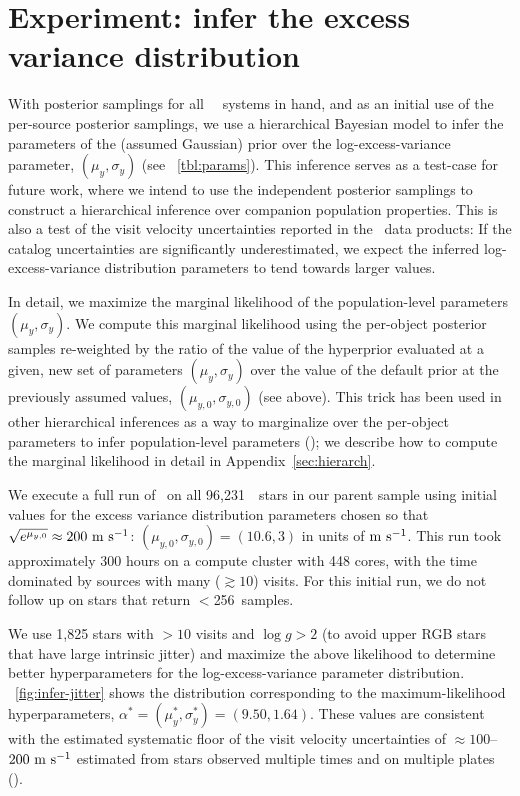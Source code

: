 \documentclass[modern, letterpaper]{aastex62}
\newcommand{\apogee}{\project{\acronym{APOGEE}}}
\newcommand{\thejoker}{\project{The~Joker}}
\newcommand{\DR}{\acronym{DR14}}
\newcommand{\logg}{\ensuremath{\log g}}
\newcommand{\nposterior}{256}
\newcommand{\nstars}{96,231}
\begin{document}
\section{Experiment: infer the excess variance distribution}
\label{sec:inferjitter}

With posterior samplings for all \apogee\ \DR\ systems in hand, and as an
initial use of the per-source posterior samplings, we use a hierarchical
Bayesian model to infer the parameters of the (assumed Gaussian) prior over the
log-excess-variance parameter, $(\mu_y, \sigma_y)$ (see
\tablename~\ref{tbl:params}).
This inference serves as a test-case for future work, where we intend to use the
independent posterior samplings to construct a hierarchical inference over
companion population properties.
This is also a test of the visit velocity uncertainties reported in the \apogee\
data products: If the catalog uncertainties are significantly underestimated, we
expect the inferred log-excess-variance distribution parameters to tend towards
larger values.

In detail, we maximize the marginal likelihood of the population-level
parameters $(\mu_y, \sigma_y)$.
We compute this marginal likelihood using the per-object posterior samples
re-weighted by the ratio of the value of the hyperprior evaluated at a given,
new set of parameters $(\mu_y, \sigma_y)$ over the value of the default prior at
the previously assumed values, $(\mu_{y,0}, \sigma_{y,0})$ (see above).
This trick has been used in other hierarchical inferences as a way to
marginalize over the per-object parameters to infer population-level parameters
(\citealt{Hogg:2010,Foreman-Mackey:2014}); we describe how to compute the
marginal likelihood in detail in Appendix~\ref{sec:hierarch}.

We execute a full run of \thejoker\ on all \nstars\ \apogee\ stars in our parent
sample using initial values for the excess variance distribution parameters
chosen so that $\sqrt{e^{\mu_{y,0}}} \approx 200~\mathrm{m}~\mathrm{s}^{-1}$: $(\mu_{y,0},
\sigma_{y,0}) = (10.6, 3)$ in units of $\mathrm{m}~\mathrm{s}^{-1}$.
This run took approximately 300 hours on a compute cluster with 448 cores, with
the time dominated by sources with many ($\gtrsim 10$) visits.  For this initial
run, we do not follow up on stars that return $<$\nposterior\ samples.

We use 1,825 stars with $>10$ visits and $\logg > 2$ (to avoid upper RGB stars
that have large intrinsic jitter) and maximize the above likelihood to determine
better hyperparameters for the log-excess-variance parameter distribution.
\figurename~\ref{fig:infer-jitter} shows the distribution corresponding to the
maximum-likelihood hyperparameters, $\alpha^* = (\mu_y^*, \sigma_y^*) = (9.50,
1.64)$.
These values are consistent with the estimated systematic floor of the visit
velocity uncertainties of $\approx 100$--$200~\mathrm{m}~\mathrm{s}^{-1}$ estimated from stars
observed multiple times and on multiple plates (\citealt{Nidever:2015}).
\end{document}
